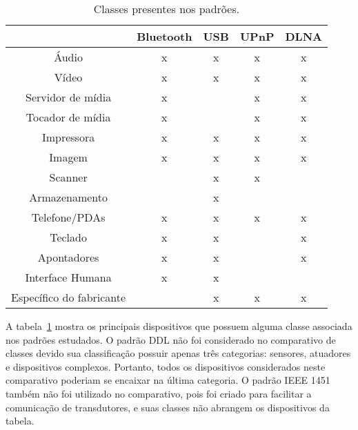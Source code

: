 \begin{table}
	\begin{center}
		\begin{tabular}{ccccc}
		\hline
									& \textbf{Bluetooth} 	& \textbf{USB}	& \textbf{UPnP} & \textbf{DLNA}	\\
		\hline
		\hline
		Áudio						& x						& x				& x 			& x				\\
		\hline
		Vídeo						& x						& x				& x				& x				\\
		\hline
		Servidor de mídia			& x						&				& x 			& x				\\
		\hline
		Tocador de mídia			& x						&				& x				& x				\\
		\hline
		Impressora 					& x						& x				& x				& x				\\
		\hline
		Imagem	 					& x						& x				& x				& x				\\
		\hline
		Scanner						& 						& x				& x				& 				\\
		\hline
		Armazenamento				&						& x				& 				& 				\\	
		\hline
		Telefone/PDAs				& x						& x				& x				& x				\\
		\hline
		Teclado						& x						& x				& 				& x				\\
		\hline
		Apontadores					& x						& x				& 				& x 			\\
		\hline
		Interface Humana		 	& x						& x				&  				&  				\\
		\hline
		Específico do fabricante 	&						& x				& x				& x				\\
		\hline								
		\end{tabular}
	\end{center}
	\caption{Classes presentes nos padrões.}
	\label{tab:comparativoClasses}
\end{table}

A tabela~\ref{tab:comparativoClasses} mostra os principais dispositivos que possuem alguma classe associada nos padrões estudados. O padrão DDL não foi considerado no comparativo de classes devido sua classificação possuir apenas três categorias: sensores, atuadores e dispositivos complexos. Portanto, todos os dispositivos considerados neste comparativo poderiam se encaixar na última categoria. O padrão IEEE 1451 também não foi utilizado no comparativo, pois foi criado para facilitar a comunicação de transdutores, e suas classes não abrangem os dispositivos da tabela.


